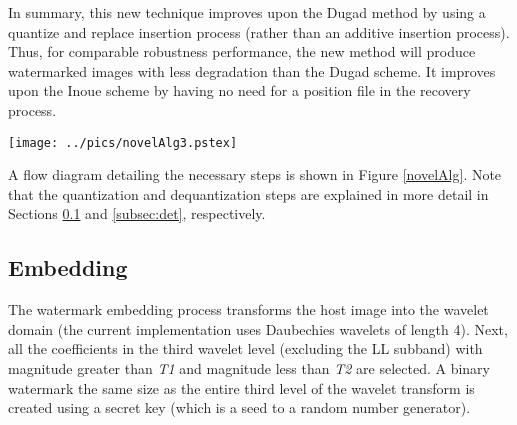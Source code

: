 \documentclass[10pt,twocolumn]{article}
\begin{document}
In summary, this new technique improves upon the Dugad method by using a 
quantize and replace insertion process (rather than an additive insertion process).
Thus, for comparable robustness performance, the new method will produce watermarked images
with less degradation than the Dugad scheme.
It improves upon the Inoue scheme
by having no need for a position file in the recovery process.

\begin{figure*}[!t]
	\begin{center}
		\texttt{[image: ../pics/novelAlg3.pstex]}
	\end{center}
	\caption{The blind quantization based watermarking scheme. The top part shows
	the insertion process whereas the bottom part shows the detection process.}
	\label{novelAlg}
\end{figure*}


A flow diagram detailing the necessary steps is shown in Figure \ref{novelAlg}.
Note that the quantization and dequantization steps are explained in more
detail in Sections \ref{sub:embed} and \ref{subsec:det}, respectively.
\subsection{Embedding}
\label{sub:embed}
The watermark embedding process transforms the host image into the wavelet domain (the
current implementation uses Daubechies wavelets of length 4). Next, all the coefficients in the third
wavelet level (excluding the LL subband) with magnitude
greater than \emph{T1} and magnitude less than \emph{T2} are selected. 
A binary watermark
the same size as the 
entire third level of the wavelet transform
is created using a secret key (which is a seed to a random
number generator). 
\end{document}
